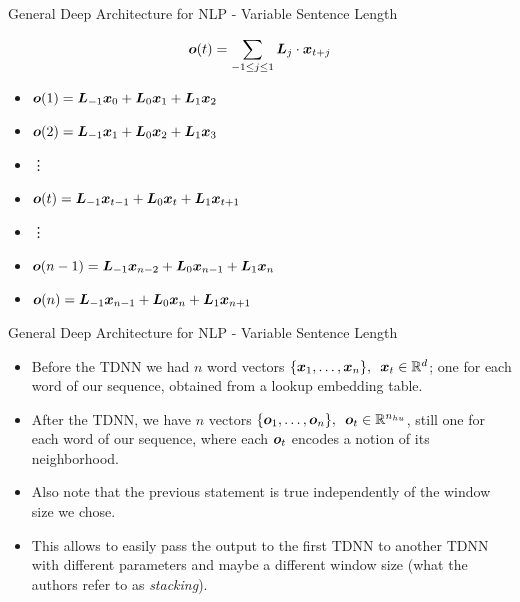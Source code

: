 \documentclass[handout]{beamer} %
\begin{document}
  \begin{frame}{General Deep Architecture for NLP - Variable Sentence Length}

    $${\bm{o}}(t)=\sum_{-1 \leq j \leq 1}{{\bm{L}}_j \cdot {\bm{x}}_{t+j}}$$

      \begin{centering}
          \begin{itemize}[<+->]
              \item[] ${\bm{o}}(1)={\bm{L}}_{-1}{\bm{x}}_{0}+{\bm{L}}_0{\bm{x}}_{1}+{\bm{L}}_1{\bm{x}}_2$
              \item[] ${\bm{o}}(2)={\bm{L}}_{-1}{\bm{x}}_{1}+{\bm{L}}_0{\bm{x}}_{2}+{\bm{L}}_1{\bm{x}}_3$
              \item[] \hspace{2.7cm}\vdots
              \item[] ${\bm{o}}(t)={\bm{L}}_{-1}{\bm{x}}_{t-1}+{\bm{L}}_0{\bm{x}}_{t}+{\bm{L}}_1{\bm{x}}_{t+1}$
              \item[] \hspace{2.7cm}\vdots
              \item[] ${\bm{o}}(n-1)={\bm{L}}_{-1}{\bm{x}}_{n-2}+{\bm{L}}_0{\bm{x}}_{n-1}+{\bm{L}}_1{\bm{x}}_{n}$
              \item[] ${\bm{o}}(n)={\bm{L}}_{-1}{\bm{x}}_{n-1}+{\bm{L}}_0{\bm{x}}_{n}+{\bm{L}}_1{\bm{x}}_{n+1}$
         \end{itemize}
      \end{centering}
  \end{frame}


  \begin{frame}{General Deep Architecture for NLP - Variable Sentence Length}
      \begin{itemize}[<+->]
          \item Before the TDNN we had $n$ word vectors
           $\{{\bm{x}}_1,\ldots,{\bm{x}}_n\},\enspace{\bm{x}}_t\in{\mathbb{R}}^d$; one for each word of
           our sequence, obtained from a lookup embedding table.
       \item After the TDNN, we have $n$ vectors $\{{\bm{o}}_1,\ldots,{\bm{o}}_n\},
           \enspace{\bm{o}}_t\in{\mathbb{R}}^{n_{hu}}$, still one for each word of our
           sequence, where each ${\bm{o}}_t$ encodes a notion of its
           neighborhood.
       \item Also note that the previous statement is true independently of the
           window size we chose.
       \item This allows to easily pass the output to the first TDNN to another
           TDNN with different parameters and maybe a different window size
           (what the authors refer to as \textit{stacking}).

        
      \end{itemize}
  \end{frame}
\end{document}
